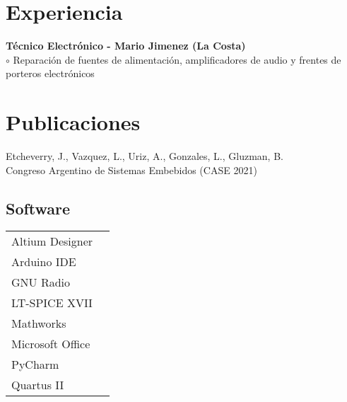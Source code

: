 \documentclass[a4paper,10pt]{article}
\begin{document}
\begin{adjustbox}{valign=t}
\begin{minipage}{0.60\textwidth}
\section*{Experiencia}
\begin{description}
\raggedright

\item[ \textcolor{ColorOne}{2015-2019}] 
	\textbf{Técnico Electrónico - Mario Jimenez (La Costa)}\\ \Myskip
	\textcolor{ColorOne}{$\circ$} 	Reparación de fuentes de alimentación, amplificadores de audio y frentes de porteros electrónicos \\	 	
\end{description}
\section*{Publicaciones}
\begin{description}
	\raggedright
	\item Etcheverry, J., Vazquez, L., Uriz, A., Gonzales, L., Gluzman, B.
	\\
Congreso Argentino de Sistemas Embebidos (CASE 2021) 
	
\end{description}
\begin{multicols}{2}
\section*{Software}
\begin{tabular}{ll}
	Altium Designer     & \\
	Arduino IDE 		& \\
	GNU Radio 	        & \\
	LT-SPICE XVII    	& \\
	Mathworks 	        & \\
	Microsoft Office 	& \\
	PyCharm	            & \\
	Quartus II        	& \\
\end{tabular}
\vfill\null \columnbreak 

\end{multicols}
\end{minipage}
\end{adjustbox}
\end{document}
